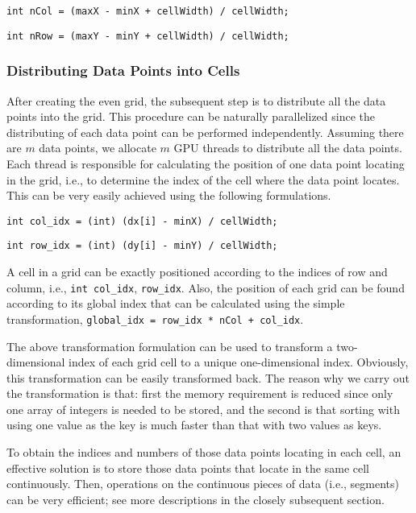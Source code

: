\documentclass[final,5p,times,twocolumn,authoryear]{elsarticle}
\begin{document}
			\texttt{int nCol = (maxX - minX + cellWidth) / cellWidth;}
			
			\texttt{int nRow = (maxY - minY + cellWidth) / cellWidth;}
			
			\subsubsection{Distributing Data Points into Cells}
			
			After creating the even grid, the subsequent step is to distribute all the 
			data points into the grid. This procedure can be naturally parallelized 
			since the distributing of each data point can be performed independently. 
			Assuming there are $m$ data points, we allocate $m$ GPU threads to distribute all 
			the data points. Each thread is responsible for calculating the position of 
			one data point locating in the grid, i.e., to determine the index of the 
			cell where the data point locates. This can be very easily achieved using 
			the following formulations.
			
			\texttt{int col{\_}idx = (int) (dx[i] - minX) / cellWidth;}
			
			\texttt{int row{\_}idx = (int) (dy[i] - minY) / cellWidth;}
			
			A cell in a grid can be exactly positioned according to the indices of row 
			and column, i.e., \texttt{int col{\_}idx}, \texttt{row{\_}idx}. Also, the position of each 
			grid can be found according to its global index that can be calculated using 
			the simple transformation, \texttt{global{\_}idx = row{\_}idx * nCol + col{\_}idx}. 
			
			The above transformation formulation can be used to transform a 
			two-dimensional index of each grid cell to a unique one-dimensional index. 
			Obviously, this transformation can be easily transformed back. The reason 
			why we carry out the transformation is that: first the memory requirement is 
			reduced since only one array of integers is needed to be stored, and the 
			second is that sorting with using one value as the key is much faster than 
			that with two values as keys. 
			
			To obtain the indices and numbers of those data points locating in each 
			cell, an effective solution is to store those data points that locate in the 
			same cell continuously. Then, operations on the continuous pieces of data 
			(i.e., segments) can be very efficient; see more descriptions in the closely 
			subsequent section.
			
\end{document}
